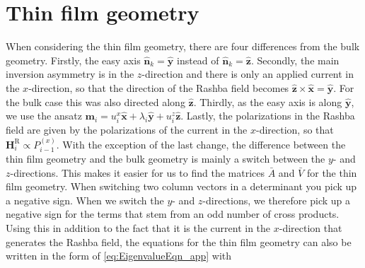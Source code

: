 \section{Thin film geometry}
When considering the thin film geometry, there are four differences from the bulk geometry. Firstly, the easy axis $\mathbold{\hat{n}}_k = \mathbold{\hat{y}}$ instead of $\mathbold{\hat{n}}_k = \mathbold{\hat{z}}$. Secondly, the main inversion asymmetry is in the $z$-direction and there is only an applied current in the $x$-direction, so that the direction of the Rashba field becomes $\mathbold{\hat{z}}\times\mathbold{\hat{x}} = \mathbold{\hat{y}}$. For the bulk case this was also directed along $\mathbold{\hat{z}}$. Thirdly, as the easy axis is along $\mathbold{\hat{y}}$, we use the ansatz $\mathbold{m}_i = u^x_i\mathbold{\hat{x}}+\lambda_i\mathbold{\hat{y}}+u^z_i\mathbold{\hat{z}}$. Lastly, the polarizations in the Rashba field are given by the polarizations of the current in the $x$-direction, so that $\mathbold{H}^{\textrm{R}}_i \propto P^{(x)}_{i-1}$. With the exception of the last change, the difference between the thin film geometry and the bulk geometry is mainly a switch between the $y$- and $z$-directions. This makes it easier for us to find the matrices $\bar{A}$ and $\bar{V}$ for the thin film geometry. When switching two column vectors in a determinant you pick up a negative sign. When we switch the $y$- and $z$-directions, we therefore pick up a negative sign for the terms that stem from an odd number of cross products. Using this in addition to the fact that it is the current in the $x$-direction that generates the Rashba field, the equations for the thin film geometry can also be written in the form of \eqref{eq:EigenvalueEqn_app} with 
